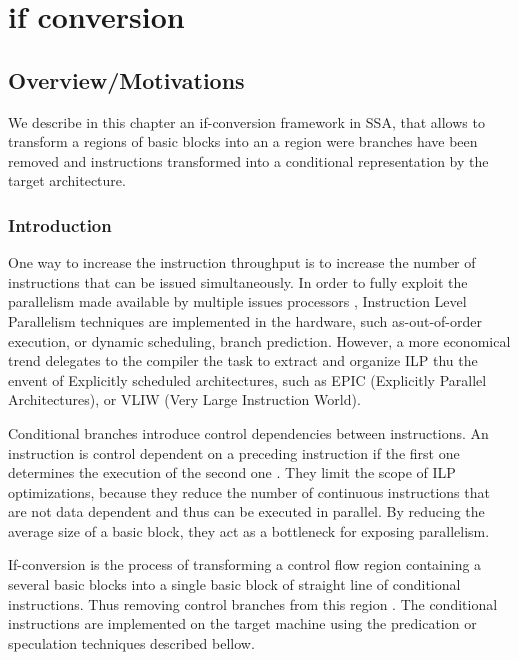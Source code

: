 \chapter{if conversion }
\graphicspath{{img/}{if_conversion/img/}{part4/if_conversion/img/}}
	
\newcommand\cond{~?~}

\setcounter{tocdepth}{3} 
\tableofcontents

\section{Overview/Motivations}

We describe in this chapter an if-conversion framework in SSA, that allows to transform a regions of basic blocks into an a region were branches have been removed and instructions transformed into a conditional representation by the target architecture.

\subsection{Introduction}

One way to increase the instruction throughput is to increase the number of instructions that can be issued simultaneously. In order to fully exploit the parallelism made available by multiple issues processors \cite{Rau:2003:IP:1074100.1074489}, Instruction Level Parallelism techniques are implemented in the hardware, such as-out-of-order execution, or dynamic scheduling, branch prediction. However, a more economical trend delegates to the compiler the task to extract and organize ILP thu the envent of Explicitly scheduled architectures, such as EPIC (Explicitly Parallel Architectures), or VLIW (Very Large Instruction World).

Conditional branches introduce control dependencies between instructions. An instruction is control dependent on a preceding instruction if the first one determines the execution of the second one \cite{Kennedy:2001:OCM:502981}. They limit the scope of ILP optimizations, because they reduce the number of continuous instructions that are not data dependent and thus can be executed in parallel. By reducing the average size of a basic block, they act as a bottleneck for exposing parallelism.

If-conversion is the process of transforming a control flow region containing a several basic blocks into a single basic block of straight line of conditional instructions. Thus removing control branches from this region \cite{Schlansker97achievinghigh}. The conditional instructions are implemented on the target machine using the predication or speculation techniques described bellow.


